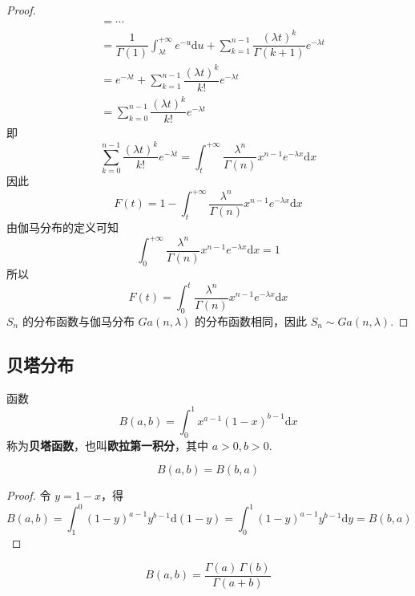 \begin{proof}
$$\begin{aligned}
        &= \cdots \\
        &= \dfrac{1}{\Gamma(1)} \int_{\lambda t}^{+\infty} e^{-u} \text{d}u + \sum_{k=1}^{n-1} \dfrac{(\lambda t)^{k}}{\Gamma(k+1)} e^{-\lambda t} \\
        &= e^{-\lambda t} + \sum_{k=1}^{n-1} \dfrac{(\lambda t)^{k}}{k!} e^{-\lambda t} \\
        &= \sum_{k=0}^{n-1} \dfrac{(\lambda t)^{k}}{k!} e^{-\lambda t}
    \end{aligned}
    $$
    即
    $$
    \sum_{k=0}^{n-1} \dfrac{(\lambda t)^{k}}{k!} e^{-\lambda t} = \int_{t}^{+\infty} \dfrac{\lambda^n}{\Gamma(n)} x^{n-1} e^{-\lambda x} \text{d}x
    $$
    因此
    $$
    F(t) = 1 - \int_{t}^{+\infty} \dfrac{\lambda^n}{\Gamma(n)} x^{n-1} e^{-\lambda x} \text{d}x
    $$
    由伽马分布的定义可知
    $$
    \int_{0}^{+\infty} \dfrac{\lambda^n}{\Gamma(n)} x^{n-1} e^{-\lambda x} \text{d}x = 1
    $$
    所以
    $$
    F(t) = \int_{0}^{t} \dfrac{\lambda^n}{\Gamma(n)} x^{n-1} e^{-\lambda x} \text{d}x
    $$
    $S_n$ 的分布函数与伽马分布 $Ga(n,\lambda)$ 的分布函数相同，因此 $S_n \sim Ga(n,\lambda)$.
\end{proof}

\subsection{贝塔分布}

\begin{definition}
    \indent 函数
    \begin{equation}
        B(a,b) = \int_{0}^{1} x^{a-1} (1-x)^{b-1} \mathrm{d}x
    \end{equation}
    称为\textbf{贝塔函数}，也叫\textbf{欧拉第一积分}，其中 $a>0, b>0$.
\end{definition}

\begin{property}
    \begin{equation}
        B(a,b) = B(b,a)
    \end{equation}
\end{property}

\begin{proof}
    令 $y = 1-x$，得
    $$
    B(a,b) = \int_{1}^{0} (1-y)^{a-1} y^{b-1} \mathrm{d}(1-y) = \int_{0}^{1} (1-y)^{a-1} y^{b-1} \mathrm{d}y = B(b,a)
    $$

    \vspace{-1.8em}
\end{proof}

\begin{property}
    \begin{equation}
        B(a,b) = \dfrac{\Gamma(a) \, \Gamma(b)}{\Gamma(a+b)}
    \end{equation}
\end{property}

